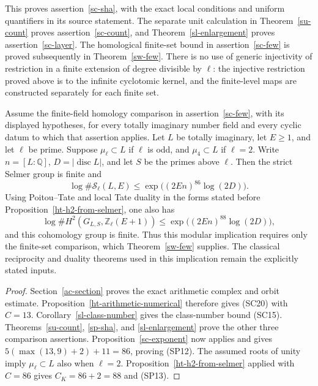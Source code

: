 This proves assertion~\ref{sc-sha}, with the exact local
conditions and uniform quantifiers in its source statement.
The separate unit calculation in Theorem~\ref{su-count}
proves assertion~\ref{sc-count}, and
Theorem~\ref{sl-enlargement} proves assertion~\ref{sc-layer}.
The homological finite-set bound in assertion~\ref{sc-few}
is proved subsequently in Theorem~\ref{sw-few}.
There is no use of generic injectivity of restriction
in a finite extension of degree divisible by $\ell$:
the injective restriction proved above is to the
infinite cyclotomic kernel, and the finite-level maps
are constructed separately for each finite set.

\begin{corollary}\label{sp-conditional-coarse}
Assume the finite-field homology comparison in
assertion~\ref{sc-few}, with its displayed hypotheses,
for every totally imaginary number field and every cyclic
datum to which that assertion applies.
Let $L$ be totally imaginary, let $E\ge1$, and let $\ell$
be prime.  Suppose $\mu_\ell\subset L$ if $\ell$ is odd,
and $\mu_4\subset L$ if $\ell=2$.
Write $n=[L:\mathbb Q]$, $D=|\operatorname{disc}L|$,
and let $S$ be the primes above $\ell$.
Then the strict Selmer group is finite and
\[
 \log\#\mathcal S_\ell(L,E)
       \le\exp\bigl((2En)^{86}\log(2D)\bigr).
 \tag{SP12}
\]
Using Poitou--Tate and local Tate duality in the forms
stated before Proposition~\ref{ht-h2-from-selmer}, one also has
\[
 \log\#H^2(G_{L,S},\mathbb Z_\ell(E+1))
       \le\exp\bigl((2En)^{88}\log(2D)\bigr),
 \tag{SP13}
\]
and this cohomology group is finite.
Thus this modular implication requires only the finite-set
comparison, which Theorem~\ref{sw-few} supplies.
The classical reciprocity and duality theorems used in this
implication remain the explicitly stated inputs.
\end{corollary}
\begin{proof}
Section~\ref{ac-section} proves the exact arithmetic complex
and orbit estimate.  Proposition~\ref{ht-arithmetic-numerical}
therefore gives (SC20) with $C=13$.
Corollary~\ref{sl-class-number} gives the class-number bound
(SC15).  Theorems~\ref{su-count}, \ref{sp-sha}, and
\ref{sl-enlargement} prove the other three comparison
assertions.  Proposition~\ref{sc-exponent} now applies and
gives $5(\max(13,9)+2)+11=86$, proving (SP12).
The assumed roots of unity imply $\mu_\ell\subset L$
also when $\ell=2$.  Proposition~\ref{ht-h2-from-selmer}
applied with $C=86$ gives $C_K=86+2=88$ and (SP13).
\end{proof}




